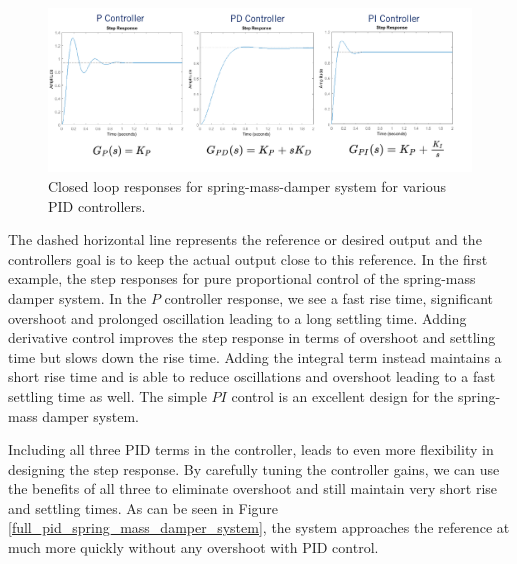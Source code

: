 \begin{figure}[!htb]
\begin{center}
\includegraphics[scale=0.380]{img/longitudinal_control/closed_loop_spring_mass_damper_system.jpeg}
\end{center}
\caption{Closed loop responses for spring-mass-damper system for various PID controllers.}
\label{closed_loop_spring_mass_damper_system}
\end{figure}

The dashed horizontal line represents the reference or desired output and the controllers goal is to keep the actual output close to this reference. In the first example, the step responses for pure proportional control of the spring-mass damper system. In the $P$ controller response, we see a fast rise time, significant overshoot and prolonged oscillation leading to a long settling time. Adding derivative control improves the step response in terms of overshoot and settling time but slows down the rise time. Adding the integral term instead maintains a short rise time and is able to reduce oscillations and overshoot leading to a fast settling time as well. The simple $PI$ control is an excellent design for the spring-mass damper system. 

Including all three PID terms in the controller, leads to even more flexibility in designing the step response. By carefully tuning the controller gains, we can use the benefits of all three to eliminate overshoot and still maintain very short rise and settling times. As can be seen in Figure \ref{full_pid_spring_mass_damper_system}, the system approaches the reference at much more quickly without any overshoot with PID control.  

